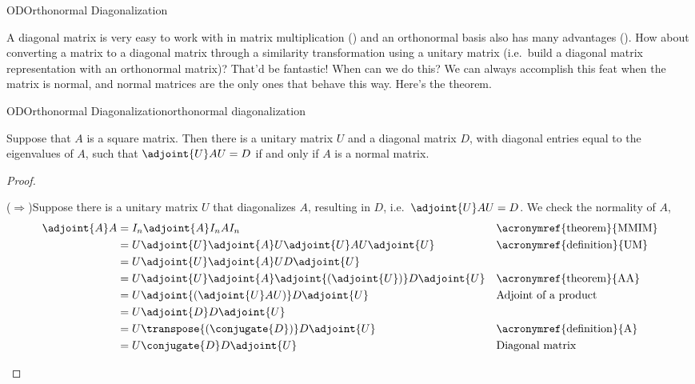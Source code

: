 \begin{subsect}{OD}{Orthonormal Diagonalization}
%
\begin{para}A diagonal matrix is very easy to work with in matrix multiplication () and an orthonormal basis also has many advantages ().  How about converting a matrix to a diagonal matrix through a similarity transformation using a unitary matrix (i.e.\ build a diagonal matrix representation with an orthonormal matrix)?  That'd be fantastic!  When can we do this?  We can always accomplish this feat when the matrix is normal, and normal matrices are the only ones that behave this way.  Here's the theorem.\end{para}
%
\begin{theorem}{OD}{Orthonormal Diagonalization}{orthonormal diagonalization}
\begin{para}Suppose that $A$ is a square matrix.   Then there is a unitary matrix $U$ and a diagonal matrix $D$, with diagonal entries equal to the eigenvalues of $A$, such that $\adjoint{U}AU=D$ if and only if $A$ is a normal matrix.\end{para}
\end{theorem}
%
%
\begin{proof}
\begin{para}($\Rightarrow$)\quad  Suppose there is a unitary matrix $U$ that diagonalizes $A$, resulting in $D$, i.e.\ $\adjoint{U}AU=D$.  We check the normality of $A$,
%
\begin{align*}
\adjoint{A}A
&=I_n   \adjoint{A}   I_n   A  I_n&&\text{\acronymref{theorem}{MMIM}}\\
&=U\adjoint{U}   \adjoint{A}   U\adjoint{U}   A    U\adjoint{U}&&\text{\acronymref{definition}{UM}}\\
&=U  \adjoint{U}\adjoint{A}U    D    \adjoint{U}\\
&=U  \adjoint{U}\adjoint{A}\adjoint{\left(\adjoint{U}\right)}    D    \adjoint{U}&&\text{\acronymref{theorem}{AA}}\\
&=U  \adjoint{\left(\adjoint{U}AU\right)}    D    \adjoint{U}&&\text{Adjoint of a product}\\
&=U  \adjoint{D}    D    \adjoint{U}\\
&=U  \transpose{\left(\conjugate{D}\right)}    D    \adjoint{U}&&\text{\acronymref{definition}{A}}\\
&=U  \conjugate{D}    D    \adjoint{U}&&\text{Diagonal matrix}\\

\end{align*}
\end{para}
\end{proof}
\end{subsect}
